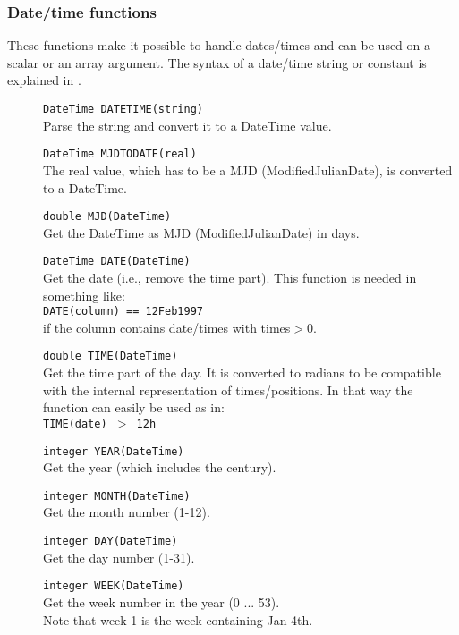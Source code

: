 \subsubsection{Date/time functions}
These functions make it possible to handle dates/times and can be used
on a scalar or an array argument. 
The syntax of a date/time string or constant is explained in
.
\begin{description}
  \item[] \texttt{DateTime DATETIME(string)}\\
       Parse the string and convert it to a DateTime value.
  \item[] \texttt{DateTime MJDTODATE(real)}\\
       The real value, which has to be a MJD (ModifiedJulianDate), is
       converted to a DateTime.
  \item[] \texttt{double MJD(DateTime)}\\
        Get the DateTime as MJD (ModifiedJulianDate) in days.
  \item[] \texttt{DateTime DATE(DateTime)}\\
        Get the date (i.e., remove the time part). This function is
        needed in something like:
       \\\texttt{DATE(column) == 12Feb1997}
       \\if the column contains date/times with times$>$0.
  \item[] \texttt{double TIME(DateTime)}\\
       Get the time part of the day. It is converted to radians to
       be compatible with the internal representation of times/positions.
       In that way the function can easily be used as in:
       \\\texttt{TIME(date) $>$ 12h}
  \item[] \texttt{integer YEAR(DateTime)}\\
        Get the year (which includes the century).
  \item[] \texttt{integer MONTH(DateTime)}\\
        Get the month number (1-12).
  \item[] \texttt{integer DAY(DateTime)}\\
        Get the day number (1-31).
  \item[] \texttt{integer WEEK(DateTime)}\\
        Get the week number in the year (0 ... 53).
        \\Note that week 1 is the week containing Jan 4th.

\end{description}
